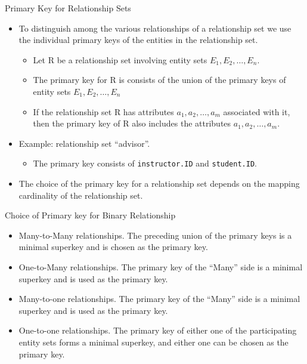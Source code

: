 \documentclass[aspectratio=169]{beamer}
\begin{document}
\begin{frame}{Primary Key for Relationship Sets}
    \begin{itemize}
        \item To distinguish among the various relationships of a relationship set we use the individual primary keys of the entities in the relationship set.
        \begin{itemize}
            \item Let R be a relationship set involving entity sets $E_1, E_2, \ldots, E_n$.
            \item The primary key for R is consists of the union of the primary keys of entity sets $E_1, E_2, \ldots, E_n$
            \item If the relationship set R has attributes $a_1, a_2, \ldots, a_m$ associated with it, then the primary key of R also includes the attributes $a_1, a_2, \ldots, a_m$.
        \end{itemize}
        \item Example: relationship set ``advisor''.
        \begin{itemize}
            \item The primary key consists of \texttt{instructor.ID} and \texttt{student.ID}.
        \end{itemize}
        \item The choice of the primary key for a relationship set depends on the mapping cardinality of the relationship set.
    \end{itemize}
\end{frame}

\begin{frame}{Choice of Primary key for Binary Relationship}
    \begin{itemize}
        \item Many-to-Many relationships. The preceding union of the primary keys is a minimal superkey and is chosen as the primary key.
        \item One-to-Many relationships. The primary key of the ``Many'' side is a minimal superkey and is used as the primary key.
        \item Many-to-one relationships. The primary key of the ``Many'' side is a minimal superkey and is used as the primary key.
        \item One-to-one relationships. The primary key of either one of the participating entity sets forms a minimal superkey, and either one can be chosen as the primary key.
    \end{itemize}
\end{frame}
\end{document}
